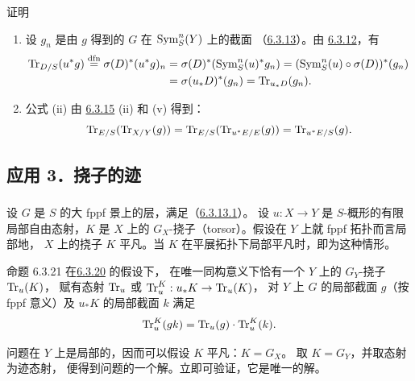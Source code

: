 \begin{enonce*}[remark]{证明}
\begin{enumerate}
\renewcommand{\theenumi}{\roman{enumi}}
\renewcommand{\labelenumi}{(\theenumi)}
\item 设 $g_{n}$ 是由 $g$ 得到的 $G$ 在 $\Sym^{n}_{S}(Y)$ 上的截面
（\hyperref[XVII.subsubsec6.3.13]{6.3.13}）。由 \hyperref[XVII.prop6.3.12]{6.3.12}，有
\begin{align*}
\Tr_{D/S}(u^{\ast}g)\overset{\dfn}{=}
\sigma(D)^{\ast}(u^{\ast}g)_{n} & =\sigma(D)^{\ast}(\sisi{u}{\Sym^n_S(u)}^{\ast}g_{n})=\sisi{u}{(\Sym^n_S(u)}\circ
\sigma(D))^\ast
(g_{n})\\
& =\sigma(u_{\ast}D)^\ast(g_{n})=\Tr_{u_{\ast}D}(g_{n}){\quoi}.
\end{align*}

\item 公式 (ii) 由 \hyperref[XVII.prop6.3.15]{6.3.15} (ii) 和 (v) 得到：
\[
\Tr_{E/S}(\Tr_{X/Y}(g))=\Tr_{E/S}(\Tr_{u^{\ast}E/E}(g))=\Tr_{u^{\ast}E/S}(g){\quoi}.
\]
\end{enumerate}
\end{enonce*}

\subsection*{应用 3．挠子的迹}

\setcounter{subsubsection}{19}
\subsubsection{}
设 $G$ 是 $S$ 的大 fppf 景上的层，满足（\hyperref[XVII.par6.3.13.1]{6.3.13.1}）。
设 $u:X\rightarrow Y$ 是 $S$-概形的有限局部自由态射，$K$ 是 $X$ 上的
$G_{X}$-挠子（torsor）。假设在 $Y$ 上就 fppf 拓扑而言局部地，
$X$ 上的挠子 $K$ 平凡。当 $K$ 在平展拓扑下局部平凡时，即为这种情形。

\begin{enonce*}{命题 6.3.21}
在\pageoriginale \hyperref[XVII.subsubsec6.3.20]{6.3.20} 的假设下，
在唯一同构意义下恰有一个 $Y$ 上的 $G_{Y}$-挠子 $\Tr_{u}(K)$，
赋有态射 $\Tr_{u}$ 或 $\Tr^{K}_{u}:u_{\ast}K\rightarrow \Tr_{u}(K)$，
对 $Y$ 上 $G$ 的局部截面 $g$（按 fppf 意义）及 $u_{\ast}K$ 的局部截面 $k$ 满足
$$
\Tr^{K}_{u}(gk)=\Tr_{u}(g)\cdot\Tr_{u}\sisi{}{^K}(k){\quoi}.
$$
\end{enonce*}

问题在 $Y$ 上是局部的，因而可以假设 $K$ 平凡：$K=G_{X}$。
取 $K=G_{Y}$，并取态射  为迹态射，
便得到问题的一个解。立即可验证，它是唯一的解。

